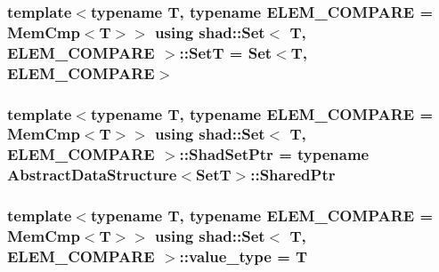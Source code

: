 \hypertarget{classshad_1_1Set_ac4975698d3f73a58bb223e28ca582fa9}{
\subsubsection[{Set\-T}]{\setlength{\rightskip}{0pt plus 5cm}template$<$typename T, typename E\-L\-E\-M\-\_\-\-C\-O\-M\-P\-A\-R\-E = Mem\-Cmp$<$\-T$>$$>$ using {\bf shad\-::\-Set}$<$ T, E\-L\-E\-M\-\_\-\-C\-O\-M\-P\-A\-R\-E $>$\-::{\bf Set\-T} =  {\bf Set}$<$T, E\-L\-E\-M\-\_\-\-C\-O\-M\-P\-A\-R\-E$>$}}\label{classshad_1_1Set_ac4975698d3f73a58bb223e28ca582fa9}
\hypertarget{classshad_1_1Set_aa35015620563a346ef29432143fe1f44}{
\subsubsection[{Shad\-Set\-Ptr}]{\setlength{\rightskip}{0pt plus 5cm}template$<$typename T, typename E\-L\-E\-M\-\_\-\-C\-O\-M\-P\-A\-R\-E = Mem\-Cmp$<$\-T$>$$>$ using {\bf shad\-::\-Set}$<$ T, E\-L\-E\-M\-\_\-\-C\-O\-M\-P\-A\-R\-E $>$\-::{\bf Shad\-Set\-Ptr} =  typename {\bf Abstract\-Data\-Structure}$<${\bf Set\-T}$>$\-::{\bf Shared\-Ptr}}}\label{classshad_1_1Set_aa35015620563a346ef29432143fe1f44}
\hypertarget{classshad_1_1Set_a20c26f02edb7c6c978a0e0b6f2b46c80}{
\subsubsection[{value\-\_\-type}]{\setlength{\rightskip}{0pt plus 5cm}template$<$typename T, typename E\-L\-E\-M\-\_\-\-C\-O\-M\-P\-A\-R\-E = Mem\-Cmp$<$\-T$>$$>$ using {\bf shad\-::\-Set}$<$ T, E\-L\-E\-M\-\_\-\-C\-O\-M\-P\-A\-R\-E $>$\-::{\bf value\-\_\-type} =  T}}\label{classshad_1_1Set_a20c26f02edb7c6c978a0e0b6f2b46c80}


